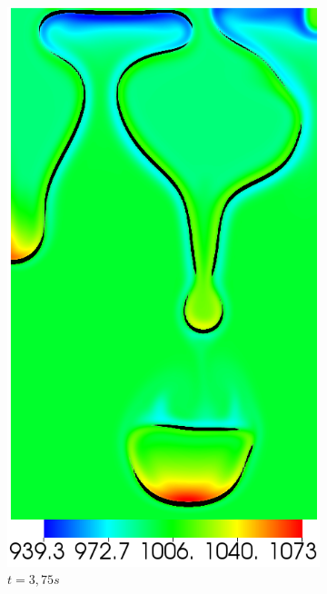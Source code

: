 \begin{figure}[H]
\begin{subfigure}[ht!]{0.2\textwidth}
		\includegraphics[width=1\textwidth]{figure/PT_RT/masse_vol/visit0018.png}
		\caption{$t=3,75s$}
	\end{subfigure}
	\begin{subfigure}[ht!]{0.2\textwidth}
		\centering

\end{subfigure}
\end{figure}
